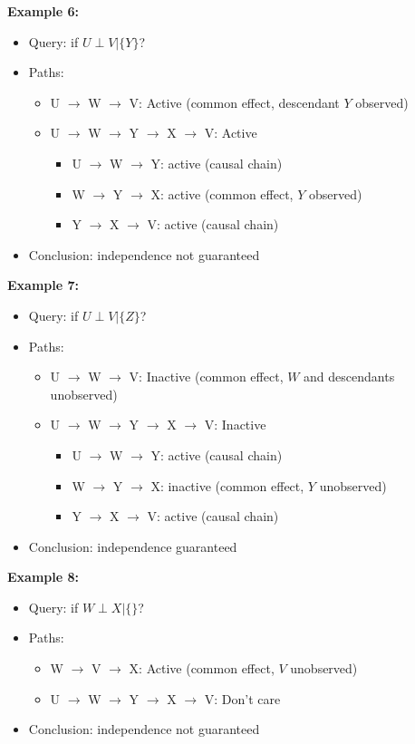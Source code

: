 \documentclass[10pt]{article}
\begin{document}
\textbf{Example 6:}
\begin{itemize}
	\item Query: if $U \perp V | \{Y\}$?
	\item Paths: 
	\begin{itemize}
	    \item U $\rightarrow$ W $\rightarrow$ V:  Active (common effect, descendant $Y$ observed)
	    \item U $\rightarrow$ W $\rightarrow$ Y $\rightarrow$ X $\rightarrow$ V:  Active
	    \begin{itemize}
	        \item U $\rightarrow$ W $\rightarrow$ Y: active (causal chain)
	        \item W $\rightarrow$ Y $\rightarrow$ X: active (common effect, $Y$ observed)
	        \item Y $\rightarrow$ X $\rightarrow$ V: active (causal chain)
        \end{itemize}
    \end{itemize}
    \item Conclusion: independence not guaranteed
\end{itemize}
\textbf{Example 7:}
\begin{itemize}
	\item Query: if $U \perp V | \{Z\}$?
	\item Paths: 
	\begin{itemize}
	    \item U $\rightarrow$ W $\rightarrow$ V:  Inactive (common effect, $W$ and descendants unobserved)
	    \item U $\rightarrow$ W $\rightarrow$ Y $\rightarrow$ X $\rightarrow$ V:  Inactive
	    \begin{itemize}
	        \item U $\rightarrow$ W $\rightarrow$ Y: active (causal chain)
	        \item W $\rightarrow$ Y $\rightarrow$ X: inactive (common effect, $Y$ unobserved)
	        \item Y $\rightarrow$ X $\rightarrow$ V: active (causal chain)
        \end{itemize}
    \end{itemize}
    \item Conclusion: independence guaranteed
\end{itemize}
\textbf{Example 8:}
\begin{itemize}
	\item Query: if $W \perp X | \{\}$?
	\item Paths: 
	\begin{itemize}
	    \item W $\rightarrow$ V $\rightarrow$ X:  Active (common effect, $V$ unobserved)
	    \item U $\rightarrow$ W $\rightarrow$ Y $\rightarrow$ X $\rightarrow$ V:  Don't care
    \end{itemize}
    \item Conclusion: independence not guaranteed
\end{itemize}
\end{document}
